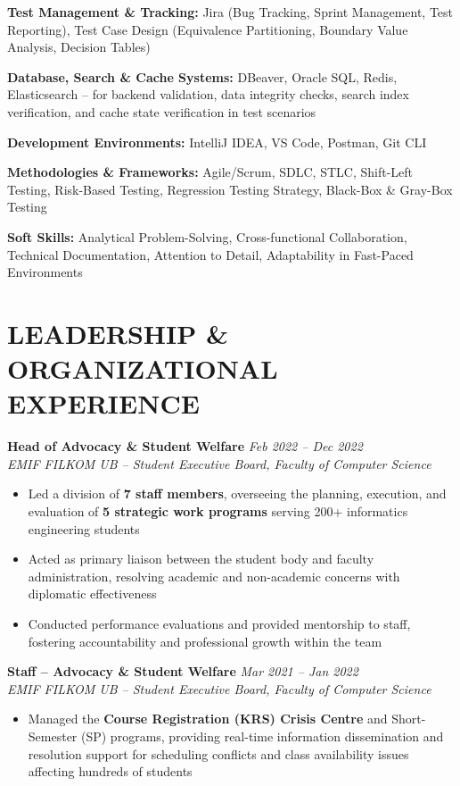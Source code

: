 \documentclass[10pt,a4paper]{article}
\newcommand{\experience}[4]{%
    \noindent\textbf{#1} \hfill \textit{#2}\\
    \textit{#3} \hfill #4\vspace{2pt}
}
\begin{document}
\textbf{Test Management \& Tracking:} Jira (Bug Tracking, Sprint Management, Test Reporting), Test Case Design (Equivalence Partitioning, Boundary Value Analysis, Decision Tables)

\textbf{Database, Search \& Cache Systems:} DBeaver, Oracle SQL, Redis, Elasticsearch -- for backend validation, data integrity checks, search index verification, and cache state verification in test scenarios

\textbf{Development Environments:} IntelliJ IDEA, VS Code, Postman, Git CLI

\textbf{Methodologies \& Frameworks:} Agile/Scrum, SDLC, STLC, Shift-Left Testing, Risk-Based Testing, Regression Testing Strategy, Black-Box \& Gray-Box Testing

\textbf{Soft Skills:} Analytical Problem-Solving, Cross-functional Collaboration, Technical Documentation, Attention to Detail, Adaptability in Fast-Paced Environments

\vspace{2pt}

\section*{LEADERSHIP \& ORGANIZATIONAL EXPERIENCE}

\experience{Head of Advocacy \& Student Welfare}{Feb 2022 -- Dec 2022}{EMIF FILKOM UB -- Student Executive Board, Faculty of Computer Science}{}
\begin{itemize}
    \item Led a division of \textbf{7 staff members}, overseeing the planning, execution, and evaluation of \textbf{5 strategic work programs} serving 200+ informatics engineering students
    \item Acted as primary liaison between the student body and faculty administration, resolving academic and non-academic concerns with diplomatic effectiveness
    \item Conducted performance evaluations and provided mentorship to staff, fostering accountability and professional growth within the team
\end{itemize}

\vspace{4pt}

\experience{Staff -- Advocacy \& Student Welfare}{Mar 2021 -- Jan 2022}{EMIF FILKOM UB -- Student Executive Board, Faculty of Computer Science}{}
\begin{itemize}
    \item Managed the \textbf{Course Registration (KRS) Crisis Centre} and Short-Semester (SP) programs, providing real-time information dissemination and resolution support for scheduling conflicts and class availability issues affecting hundreds of students
\end{itemize}
\end{document}
